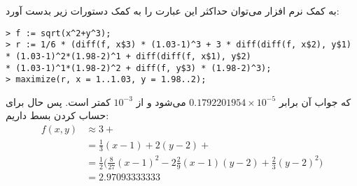\documentclass[]{article}
\begin{document}
به کمک نرم افزار
می‌توان حداکثر این عبارت را به کمک دستورات زیر بدست آورد:
\begin{latin}
\noindent
\verb|> f := sqrt(x^2+y^3);|\\
\verb|> r := 1/6 * (diff(f, x$3) * (1.03-1)^3 + 3 * diff(diff(f, x$2), y$1)|\\
\verb|* (1.03-1)^2*(1.98-2)^1 + diff(diff(f, x$1), y$2)|\\
\verb|* (1.03-1)^1*(1.98-2)^2 + diff(f, y$3) * (1.98-2)^3);|\\
\verb|> maximize(r, x = 1..1.03, y = 1.98..2);|
\end{latin}
که جواب آن برابر
$0.1792201954 \times 10^{-5}$
می‌شود و از
$10^{-3}$
کمتر است. پس
حال برای حساب کردن بسط داریم:
\begin{align*}
    f(x,y) &\approx 3 +\\
    &= \frac{1}{3} (x - 1) + 2 (y-2) +\\
    &= \frac{1}{2} \biggl(\frac{8}{27}(x-1)^2 - 2\frac{2}{9}(x-1)(y-2) + \frac{2}{3}(y-2)^2 \biggr)\\
    &= \boxed{2.97093333333}
\end{align*}
\end{document}
